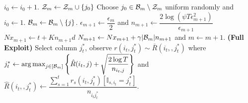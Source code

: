 \begin{algorithm}[!th]
\begin{algorithmic}[1]
\State $i_0 \leftarrow i_0 + 1$.
\Else
\State $\mathcal{Z}_m \leftarrow \mathcal{Z}_m \cup \lbrace j_0\rbrace$
\State Choose $j_0\in\mathcal{B}_m\setminus \mathcal{Z}_m$ uniform randomly and $i_0 \leftarrow 1$.
\EndIf
\Else
\ColElim
\State {}
\State {}
\State $\mathcal{B}_m \leftarrow \mathcal{B}_m \setminus \lbrace j \rbrace$. 
\EndWhile
\EndFor
\EndColElim
\ResParam
\State $\epsilon_{m+1} \leftarrow \dfrac{\epsilon_m}{2}$ and $n_{m+1} \leftarrow \dfrac{2\log(\psi T\epsilon_{m+1}^2)}{\epsilon_{m+1}}$
\State $Nx_{m+1}\leftarrow t + K n_{m+1} d$
\State $N_{m+1} \leftarrow Nx_{m+1} + \gamma |\mathcal{B}_m|n_{m+1}$ and $m \leftarrow m + 1$.
\EndResParam
\EndIf
\Else \textbf{ (Full Exploit) }
\State  Select column $j_t^*$, observe $r(i_t,j_t^*)\sim \bar{R}(i_t,,j_t^*)$ where $j_t^* \leftarrow \mathop{\rm arg\,max}_{j\in[\mathcal{B}_m]} \left\lbrace \hat{R}(i_t,j) + \sqrt{\dfrac{2\log T}{n_{i_t,j}}}\right\rbrace$ and $\hat{R}(i_t,,j_t^*)\leftarrow \dfrac{\sum_{s=1}^{t}r_s(i_t,j_t^*)[\mathbb{I}_{s,i_t} = j_t^*]}{n_{i_tj_t^*}}$.
\EndIf
\EndFor
\end{algorithmic}
\end{algorithm}


